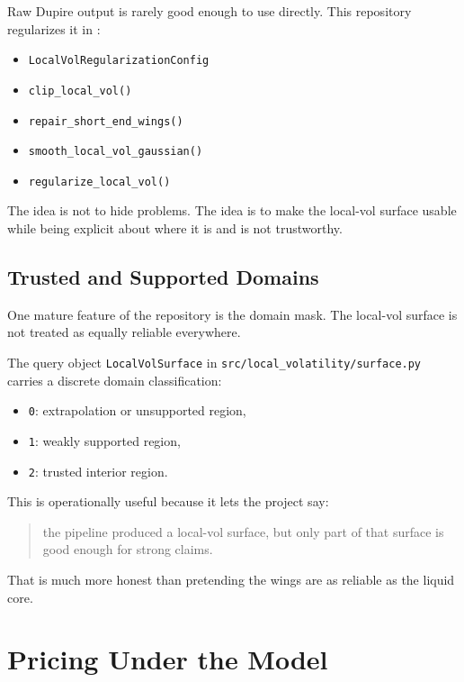 \documentclass[11pt]{article}
\begin{document}
Raw Dupire output is rarely good enough to use directly. This repository regularizes it in
:

\begin{itemize}
  \item \texttt{LocalVolRegularizationConfig}
  \item \texttt{clip\_local\_vol()}
  \item \texttt{repair\_short\_end\_wings()}
  \item \texttt{smooth\_local\_vol\_gaussian()}
  \item \texttt{regularize\_local\_vol()}
\end{itemize}

The idea is not to hide problems. The idea is to make the local-vol surface usable while being explicit about where it is and is not trustworthy.

\subsection{Trusted and Supported Domains}

One mature feature of the repository is the domain mask. The local-vol surface is not treated as equally reliable everywhere.

The query object \texttt{LocalVolSurface} in
\texttt{src/local\_volatility/surface.py}
carries a discrete domain classification:

\begin{itemize}
  \item \texttt{0}: extrapolation or unsupported region,
  \item \texttt{1}: weakly supported region,
  \item \texttt{2}: trusted interior region.
\end{itemize}

This is operationally useful because it lets the project say:

\begin{quote}
the pipeline produced a local-vol surface, but only part of that surface is good enough for strong claims.
\end{quote}

That is much more honest than pretending the wings are as reliable as the liquid core.

\section{Pricing Under the Model}
\end{document}
